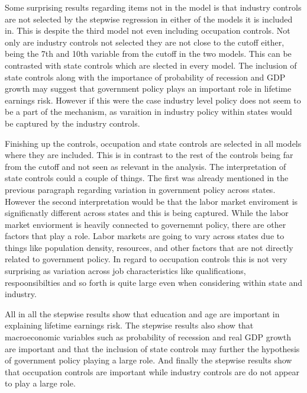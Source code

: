 \documentclass[12pt]{article}
\begin{document}
\begin{onehalfspace}
Some surprising results regarding items not in the model is that industry controls are not selected by the stepwise regression in either of the models it is included in. This is despite the third model not even including occupation controls. Not only are industry controls not selected they are not close to the cutoff either, being the 7th and 10th variable from the cutoff in the two models. This can be contrasted with state controls which are slected in every model. The inclusion of state controls along with the importance of probability of recession and GDP growth may suggest that government policy plays an important role in lifetime earnings risk. However if this were the case industry level policy does not seem to be a part of the mechanism, as varaition in industry policy within states would be captured by the industry controls.

Finishing up the controls, occupation and state controls are selected in all models where they are included. This is in contrast to the rest of the controls being far from the cutoff and not seen as relevant in the analysis. The interpretation of state controls could a couple of things. The first was already mentioned in the previous paragraph regarding variation in government policy across states. However the second interpretation would be that the labor market enviroment is significnatly different across states and this is being captured. While the labor market enviorment is heavily connected to governemnt policy, there are other factors that play a role. Labor markets are going to vary across states due to things like population density, resources, and other factors that are not directly related to government policy. In regard to occupation controls this is not very surprising as variation across job characteristics like qualifications, respoonsibilties and so forth is quite large even when considering within state and industry.

All in all the stepwise results show that education and age are important in explaining lifetime earnings risk. The stepwise results also show that macroeconomic variables such as probability of recession and real GDP growth are important and that the inclusion of state controls may further the hypothesis of government policy playing a large role. And finally the stepwise results show that occupation controls are important while industry controls are do not appear to play a large role.


\end{onehalfspace}
\end{document}
